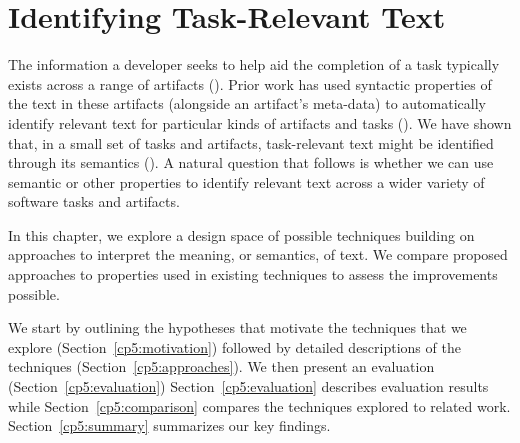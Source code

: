 \setcounter{chapter}{4}
\setcounter{rq}{1}


\chapter{Identifying Task-Relevant Text}
\label{ch:identifying}

The information a developer seeks to help aid the completion of a task typically exists
across a range of artifacts (). Prior work has used syntactic properties of the text
in these artifacts (alongside an artifact's meta-data)
to automatically identify relevant text for particular kinds of artifacts and tasks ().
We have  shown that, in a small set of tasks and artifacts, task-relevant text might be identified through its semantics (). 
A natural question that follows is whether we can use semantic or other properties to identify relevant text across a wider variety of software tasks and artifacts.

In this chapter, we explore a design space of possible techniques building on approaches to
interpret the meaning, or semantics, of text. We compare proposed approaches to properties
used in existing  techniques to assess the improvements possible. 

We start by outlining the hypotheses that motivate the techniques that we explore (Section~\ref{cp5:motivation}) followed by detailed descriptions of the
techniques (Section~\ref{cp5:approaches}).
We then present an evaluation (Section~\ref{cp5:evaluation}) 
Section~\ref{cp5:evaluation} describes evaluation results while
Section~\ref{cp5:comparison} compares the techniques explored to related work.
Section~\ref{cp5:summary} summarizes our key findings.

